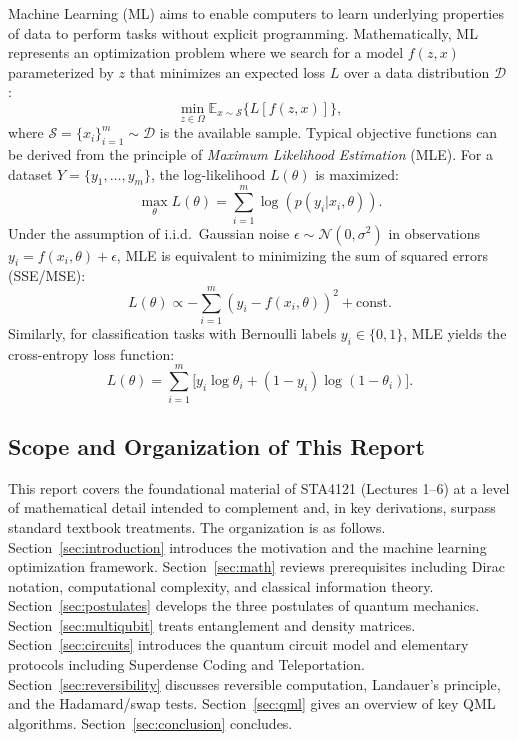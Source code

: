 \documentclass[aps, reprint, twocolumn, superscriptaddress, floatfix]{revtex4-2}
\begin{document}
Machine Learning (ML) aims to enable computers to learn underlying properties of
data to perform tasks without explicit programming. Mathematically, ML represents
an optimization problem where we search for a model $f(z,x)$ parameterized by $z$
that minimizes an expected loss $L$ over a data distribution $\mathcal{D}$
\cite{schuld2021machine}:
\begin{equation}
  \min_{z \in \Omega} \mathbb{E}_{x \sim \mathcal{S}} \bigl\{ L[f(z, x)] \bigr\},
\end{equation}
where $\mathcal{S} = \{x_i\}_{i=1}^m \sim \mathcal{D}$ is the available sample.
Typical objective functions can be derived from the principle of 
\emph{Maximum Likelihood Estimation} (MLE). For a dataset $Y = \{y_1, \dots, y_m\}$,
the log-likelihood $L(\theta)$ is maximized:
\begin{equation}
  \max_{\theta} L(\theta) = \sum_{i=1}^m \log(p(y_i | x_i, \theta)).
\end{equation}
Under the assumption of i.i.d.\ Gaussian noise $\epsilon \sim \mathcal{N}(0, \sigma^2)$
in observations $y_i = f(x_i, \theta) + \epsilon$, MLE is equivalent to minimizing
the sum of squared errors (SSE/MSE):
\begin{equation}
  L(\theta) \propto -\sum_{i=1}^m (y_i - f(x_i, \theta))^2 + \text{const}.
\end{equation}
Similarly, for classification tasks with Bernoulli labels $y_i \in \{0, 1\}$, 
MLE yields the cross-entropy loss function:
\begin{equation}
  L(\theta) = \sum_{i=1}^m \bigl[ y_i \log \theta_i + (1-y_i) \log (1-\theta_i) \bigr].
\end{equation}

\subsection{Scope and Organization of This Report}
\label{ssec:scope}

This report covers the foundational material of STA4121 (Lectures 1--6) at a
level of mathematical detail intended to complement and, in key derivations,
surpass standard textbook treatments.  The organization is as follows.
Section~\ref{sec:introduction} introduces the motivation and the machine 
learning optimization framework. Section~\ref{sec:math} reviews prerequisites 
including Dirac notation, computational complexity, and classical information theory.
Section~\ref{sec:postulates} develops the three postulates of quantum mechanics.
Section~\ref{sec:multiqubit} treats entanglement and density matrices.
Section~\ref{sec:circuits} introduces the quantum circuit model and 
elementary protocols including Superdense Coding and Teleportation.
Section~\ref{sec:reversibility} discusses reversible computation, 
Landauer's principle, and the Hadamard/swap tests.
Section~\ref{sec:qml} gives an overview of key QML algorithms.
Section~\ref{sec:conclusion} concludes.
\end{document}
